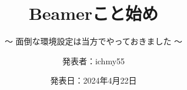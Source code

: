 %
\title{Beamerこと始め}
\subtitle{～ 面倒な環境設定は当方でやっておきました ～}
%
%
\date[4-22-2024]{発表日：2024年4月22日}
\author[ichmy55]{発表者：ichmy55}
